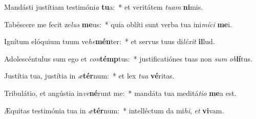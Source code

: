 \item Mandásti justítiam testimóni\textit{a} \textbf{tu}a:~* et veritátem \textit{tu}\textit{am} \textbf{ni}mis.
\item Tabéscere me fecit ze\textit{lus} \textbf{me}us:~* quia oblíti sunt verba tua ini\textit{mí}\textit{ci} \textbf{me}i.
\item Ignítum elóquium tuum ve\textit{he}\textbf{mén}ter:~* et servus tuus di\textit{lé}\textit{xit} \textbf{il}lud.
\item Adolescéntulus sum ego et \textit{con}\textbf{témp}tus:~* justificatiónes tuas non \textit{sum} \textit{ob}\textbf{lí}tus.
\item Justítia tua, justítia in \textit{æ}\textbf{tér}num:~* et lex \textit{tu}\textit{a} \textbf{vé}ritas.
\item Tribulátio, et angústia in\textit{ve}\textbf{né}runt me:~* mandáta tua meditá\textit{ti}\textit{o} \textbf{me}a est.
\item Æquitas testimónia tua in \textit{æ}\textbf{tér}num:~* intelléctum da mi\textit{hi}, \textit{et} \textbf{vi}vam.
